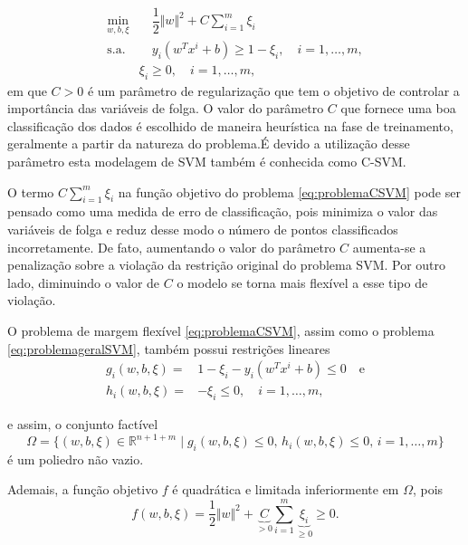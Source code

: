 \documentclass[12pt,a4paper]{scrartcl}
\def\RR{\mathds{R}}
\theoremstyle{definition}%
\begin{document}
\[ \label{eq:problemaCSVM}
\begin{aligned}
\min_{w,b,\xi} & \quad \dfrac{1}{2} \Vert w\Vert^{2} + C \sum_{i=1}^{m} \xi_{i} \\
\text{s.a.} &  \quad y_i(w^{T}x^{i}+b) \geq 1 - \xi_{i}, \quad i=1, \ldots , m, \\
& \xi_{i} \geq 0, \quad i=1, \ldots , m,\end{aligned}
\]
em que $C>0$ é um parâmetro de regularização que tem o objetivo de controlar a importância das variáveis de folga. O valor do parâmetro $C$ que fornece uma boa classificação dos dados é escolhido de maneira heurística na fase de treinamento, geralmente a partir da natureza do problema.É devido a utilização desse parâmetro esta modelagem de SVM também é conhecida como C-SVM.

O termo $C \sum_{i=1}^{m} \xi_{i}$ na função objetivo do problema \eqref{eq:problemaCSVM} pode ser pensado como uma medida de erro de classificação, pois minimiza o valor das variáveis de folga e reduz desse modo o número de pontos classificados incorretamente. De fato, aumentando o valor do parâmetro $C$ aumenta-se a penalização sobre a violação da restrição original do problema SVM. Por outro lado, diminuindo o valor de $C$ o modelo se torna mais flexível a esse tipo de violação. 

O problema de margem flexível \eqref{eq:problemaCSVM}, assim como o problema \eqref{eq:problemageralSVM}, também possui restrições lineares 
\begin{align} 
g_{i}(w,b,\xi) = & 1-\xi_{i} - y_i(w^{T}x^{i}+b) \leq 0 \quad \text{e} \\
h_{i}(w,b,\xi) = & - \xi_{i} \leq 0, \quad i=1, \ldots, m,
\end{align}

e assim, o conjunto factível
\[
\Omega = \{(w,b,\xi) \in \RR^{n+1+m} \mid g_{i}(w,b,\xi) \leq 0, \, h_{i}(w,b,\xi) \leq 0, \, i=1, \ldots, m \} 
\]
é um poliedro não vazio.

Ademais, a função objetivo $f$ é quadrática e limitada inferiormente em $\Omega$, pois 
\[
f(w,b,\xi) = \dfrac{1}{2} \Vert w\Vert^{2} + \underbrace{C}_{> 0} \sum_{i=1}^{m} \underbrace{\xi_{i}}_{\geq 0} \geq 0.
\]



\end{document}
